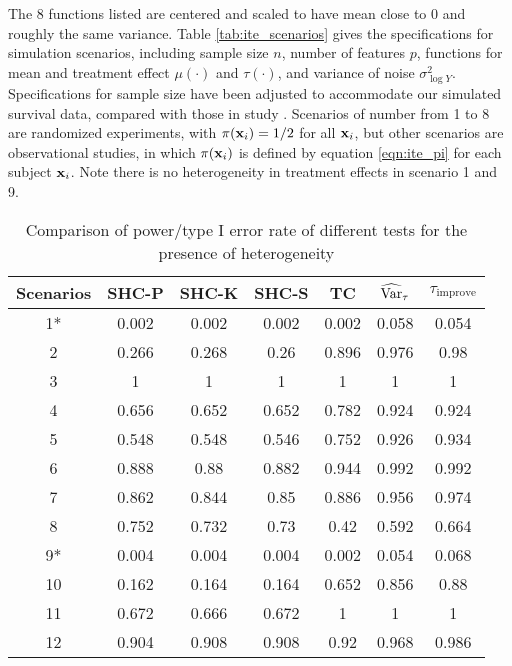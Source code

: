     The 8 functions listed are centered and scaled to have mean close to 0 and roughly the same variance. Table \ref{tab:ite_scenarios} gives the specifications for simulation scenarios, including sample size $n$, number of features $p$, functions for mean and treatment effect $\mu(\cdot)$ and $\tau(\cdot)$, and variance of noise $\sigma_{\log Y}^2$. Specifications for sample size have been adjusted to accommodate our simulated survival data, compared with those in study \cite{powers2017some}. Scenarios of number from 1 to 8 are randomized experiments, with $\pi(\mathbf{x}_i) = 1/2$ for all $\mathbf{x}_i$, but other scenarios are observational studies, in which $\pi(\mathbf{x}_i)$ is defined by equation \ref{eqn:ite_pi} for each subject $\mathbf{x}_i$. Note there is no heterogeneity in treatment effects in scenario 1 and 9.

    \begin{table}[htbp]
    \caption{Comparison of power/type I error rate of different tests for the presence of heterogeneity}
    \centering
      \begin{threeparttable}
          \begin{tabular}{c|cccccc}
          \toprule
          Scenarios & SHC-P & SHC-K & SHC-S & TC & $\operatorname{\widehat{Var}}_{\tau}$ & $\tau_{\mathrm{improve}}$ \\
          \midrule
          1*    & 0.002 & 0.002 & 0.002 & 0.002 & 0.058 & 0.054 \\
          2     & 0.266 & 0.268 & 0.26  & 0.896 & 0.976 & 0.98 \\
          3     & 1     & 1     & 1     & 1     & 1     & 1 \\
          4     & 0.656 & 0.652 & 0.652 & 0.782 & 0.924 & 0.924 \\
          5     & 0.548 & 0.548 & 0.546 & 0.752 & 0.926 & 0.934 \\
          6     & 0.888 & 0.88  & 0.882 & 0.944 & 0.992 & 0.992 \\
          7     & 0.862 & 0.844 & 0.85  & 0.886 & 0.956 & 0.974 \\
          8     & 0.752 & 0.732 & 0.73  & 0.42  & 0.592 & 0.664 \\
          9*    & 0.004 & 0.004 & 0.004 & 0.002 & 0.054 & 0.068 \\
          10    & 0.162 & 0.164 & 0.164 & 0.652 & 0.856 & 0.88 \\
          11    & 0.672 & 0.666 & 0.672 & 1     & 1     & 1 \\
          12    & 0.904 & 0.908 & 0.908 & 0.92  & 0.968 & 0.986 \\

\end{tabular}
\end{threeparttable}
\end{table}
